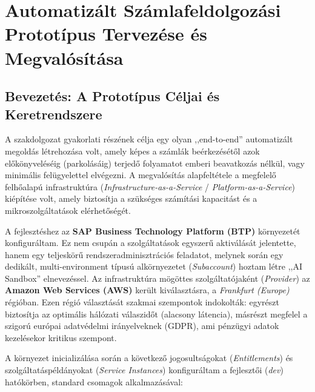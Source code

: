 \chapter{Automatizált Számlafeldolgozási Prototípus Tervezése és Megvalósítása}
\label{chap:megvalositas}

\section{Bevezetés: A Prototípus Céljai és Keretrendszere}
\label{sec:prototype_intro}

A szakdolgozat gyakorlati részének célja egy olyan ,,end-to-end'' automatizált megoldás létrehozása volt, amely képes a számlák beérkezésétől azok előkönyveléséig (parkolásáig) terjedő folyamatot emberi beavatkozás nélkül, vagy minimális felügyelettel elvégezni. A megvalósítás alapfeltétele a megfelelő felhőalapú infrastruktúra (\textit{Infrastructure-as-a-Service} / \textit{Platform-as-a-Service}) kiépítése volt, amely biztosítja a szükséges számítási kapacitást és a mikroszolgáltatások elérhetőségét.

A fejlesztéshez az \textbf{SAP Business Technology Platform (BTP)} környezetét konfiguráltam. Ez nem csupán a szolgáltatások egyszerű aktiválását jelentette, hanem egy teljeskörű rendszeradminisztrációs feladatot, melynek során egy dedikált, multi-environment típusú alkörnyezetet (\textit{Subaccount}) hoztam létre ,,AI Sandbox'' elnevezéssel. Az infrastruktúra mögöttes szolgáltatójaként (\textit{Provider}) az \textbf{Amazon Web Services (AWS)} került kiválasztásra, a \textit{Frankfurt (Europe)} régióban. Ezen régió választását szakmai szempontok indokolták: egyrészt biztosítja az optimális hálózati válaszidőt (alacsony látencia), másrészt megfelel a szigorú európai adatvédelmi irányelveknek (GDPR), ami pénzügyi adatok kezelésekor kritikus szempont.

A környezet inicializálása során a következő jogosultságokat (\textit{Entitlements}) és szolgáltatáspéldányokat (\textit{Service Instances}) konfiguráltam a fejlesztői (\textit{dev}) hatókörben, standard csomagok alkalmazásával:


